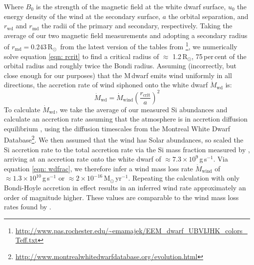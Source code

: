 \documentclass[fleqn,usenatbib]{mnras}
\newcommand{\Msun}{\mbox{$\mathrm{M}_{\odot}$}}
\newcommand{\Rsun}{\mbox{$\mathrm{R}_{\odot}$}}
\begin{document}
Where $B_0$ is the strength of the magnetic field at the white dwarf surface, $u_0$ the energy density of the wind at the secondary surface, $a$ the orbital separation, and $r_{\mathrm{wd}}$ and $r_{\mathrm{md}}$ the radii of the primary and secondary, respectively. Taking the average of our two magnetic field measurements and adopting a secondary radius of $r_{\mathrm{md}}=0.243$\,\Rsun\ from the latest version of the tables from \citet{pecaut+mamajek13-1}\footnote{\url{http://www.pas.rochester.edu/~emamajek/EEM_dwarf_UBVIJHK_colors_Teff.txt}}, we numerically solve equation \ref{eqn: rcrit} to find a critical radius of $\approx$ 1.2\,\Rsun, 75\,per\,cent of the orbital radius and roughly twice the Bondi radius. Assuming (incorrectly, but close enough for our purposes) that the M\,dwarf emits wind uniformly in all directions, the accretion rate of wind siphoned onto the white dwarf $\dot{M}_{\mathrm{wd}}$ is:
\begin{equation}
    \label{eqn: wdfrac}
\dot{M}_{\mathrm{wd}} = \dot{M}_{\mathrm{wind}} \left(\frac{r_{\mathrm{crit}}}{a}\right)^2      
\end{equation}
To calculate $\dot{M}_{\mathrm{wd}}$, we take the average of our measured Si abundances and calculate an accretion rate assuming that the atmosphere is in accretion diffusion equilibrium \citep{koester10-1}, using the diffusion timescales from the Montreal White Dwarf Database\footnote{\url{http://www.montrealwhitedwarfdatabase.org/evolution.html}}. We then assumed that the wind has Solar abundances, so scaled the Si accretion rate to the total accretion rate via the Si mass fraction measured by \citet{asplundetal09-1}, arriving at an accretion rate onto the white dwarf of $\approx7.3\times10^9$\,g\,s$^{-1}$. Via equation \ref{eqn: wdfrac}, we therefore infer a wind mass loss rate $\dot{M}_{\mathrm{wind}}$ of $\approx1.3\times10^{10}$\,g\,s$^{-1}$ or $\approx2\times10^{-16}$\,\Msun\,yr$^{-1}$. Repeating the calculation with only Bondi-Hoyle accretion in effect results in an inferred wind rate approximately an order of magnitude higher. These values are comparable to the wind mass loss rates found by \citep{debes06-1}.
\end{document}
